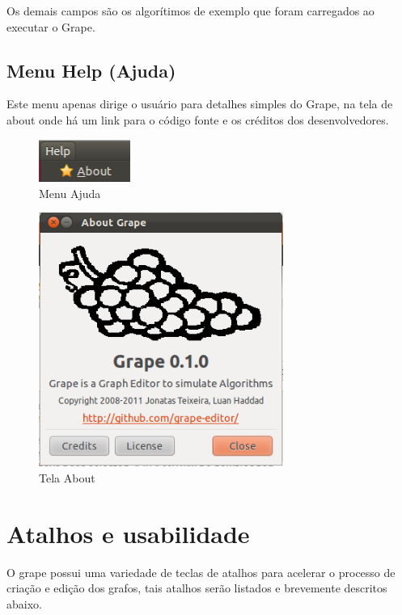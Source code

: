 \documentclass[a4paper]{abnt}
\begin{document}
Os demais campos são os algorítimos de exemplo que foram carregados ao executar o Grape.

\subsection{Menu Help (Ajuda)}

Este menu apenas dirige o usuário para detalhes simples do Grape, na tela de about onde há um link para o código fonte e os créditos dos desenvolvedores.

\begin{figure}[htb]
    \centering
	\includegraphics[width=3cm]{grape_menu_help.png}
	\caption{Menu Ajuda}
	\label{img_menu_help}
\end{figure}

\begin{figure}[H]
    \centering
	\includegraphics[width=8cm]{grape_about.png}
	\caption{Tela About}
	\label{img_about}
\end{figure}

\section{Atalhos e usabilidade}

O grape possui uma variedade de teclas de atalhos para acelerar o processo de criação e edição dos grafos, tais atalhos serão listados e brevemente descritos abaixo.
\end{document}
